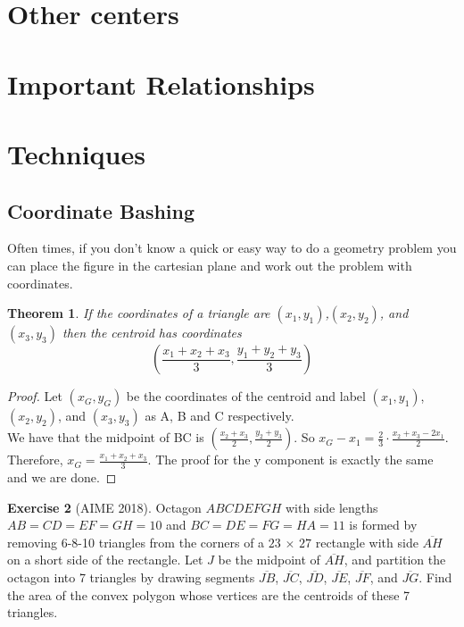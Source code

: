 \documentclass[letterpaper]{article}
\theoremstyle{plain}
\newtheorem{thm}{Theorem}[section]
\theoremstyle{definition}
\newtheorem{exercise}[thm]{Exercise}
\theoremstyle{remark}
\begin{document}
\section{Other centers}
\section{Important Relationships}
\section{Techniques}
\subsection{Coordinate Bashing}
Often times, if you don't know a quick or easy way to do a geometry problem you can place the figure in the cartesian plane and work out the problem with coordinates.
    \begin{mdframed}
        \begin{thm}
            If the coordinates of a triangle are $(x_1,y_1)$,$(x_2,y_2)$, and $(x_3,y_3)$ then the centroid has coordinates $$\left(\frac{x_1+x_2+x_3}{3},\frac{y_1+y_2+y_3}{3}\right)$$
        \end{thm}
        
    \end{mdframed}
    \begin{proof}
        Let $(x_G,y_G)$ be the coordinates of the centroid and label $(x_1,y_1)$,$(x_2,y_2)$, and $(x_3,y_3)$ as A, B and C respectively.
        \\We have that the midpoint of BC is $\left(\frac{x_2+x_3}{2},\frac{y_2+y_3}{2}\right)$. So $x_G-x_1=\frac{2}{3}\cdot\frac{x_2+x_3-2x_1}{2}$.
        Therefore, $x_G = \frac{x_1+x_2+x_3}{3}$. The proof for the y component is exactly the same and we are done.
         
    \end{proof}
    \begin{exercise}[AIME 2018]
        Octagon $ABCDEFGH$ with side lengths $AB = CD = EF = GH = 10$ and $BC = DE = FG = HA = 11$ is formed by removing 6-8-10 triangles from the corners of a $23$ $\times$ $27$ rectangle with side $\overline{AH}$ on a short side of the rectangle. Let $J$ be the midpoint of $\overline{AH}$, and partition the octagon into 7 triangles by drawing segments $\overline{JB}$, $\overline{JC}$, $\overline{JD}$, $\overline{JE}$, $\overline{JF}$, and $\overline{JG}$. Find the area of the convex polygon whose vertices are the centroids of these 7 triangles.
    \end{exercise}
\end{document}
